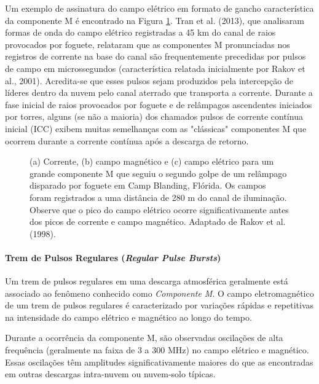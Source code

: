\documentclass[a4paper, 12pt, onecolumn,singlespacing]{article}
\begin{document}
		Um exemplo de assinatura do campo elétrico em formato de gancho característica da componente M é encontrado na Figura \ref{componente_m}. Tran et al. (2013), que analisaram formas de onda do campo elétrico registradas a 45 km do canal de raios provocados por foguete, relataram que as componentes M pronunciadas nos registros de corrente na base do canal são frequentemente precedidas por pulsos de campo em microssegundos (característica relatada inicialmente por Rakov et al., 2001). Acredita-se que esses pulsos sejam produzidos pela intercepção de líderes dentro da nuvem pelo canal aterrado que transporta a corrente. Durante a fase inicial de raios provocados por foguete e de relâmpagos ascendentes iniciados por torres, alguns (se não a maioria) dos chamados pulsos de corrente contínua inicial (ICC) exibem muitas semelhanças com as "clássicas" componentes M que ocorrem durante a corrente contínua após a descarga de retorno.
		
			\begin{figure}[!htb]
				\caption{(a) Corrente, (b) campo magnético e (c) campo elétrico para um grande componente M que seguiu o segundo golpe de um relâmpago disparado por foguete em Camp Blanding, Flórida. Os campos foram registrados a uma distância de 280 m do canal de iluminação. Observe que o pico do campo elétrico ocorre significativamente antes dos picos de corrente e campo magnético. Adaptado de Rakov et al. (1998).}
				\label{componente_m}
				 \hfill
			\end{figure}
		\paragraph{Trem de Pulsos Regulares (\textit{Regular Pulse Bursts})}
		
		Um trem de pulsos regulares em uma descarga atmosférica geralmente está associado ao fenômeno conhecido como \textit{Componente M}. O campo eletromagnético de um trem de pulsos regulares é caracterizado por variações rápidas e repetitivas na intensidade do campo elétrico e magnético ao longo do tempo.
		
		Durante a ocorrência da componente M, são observadas oscilações de alta frequência (geralmente na faixa de 3 a 300 MHz) no campo elétrico e magnético. Essas oscilações têm amplitudes significativamente maiores do que as encontradas em outras descargas intra-nuvem ou nuvem-solo típicas.
		
\end{document}

